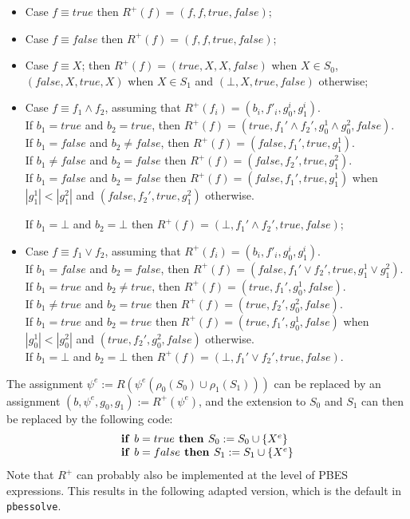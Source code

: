 \documentclass{article}
\newcommand{\If}{\text{\textbf{if }}}
\newcommand{\Then}{\text{\textbf{ then }}}
\begin{document}
\begin{itemize}
\item Case $f \equiv true$  then $R^+(f) = (f,f, true,false)$;

\item Case $f \equiv false$ then $R^+(f) = (f,f,true,false)$;

\item Case $f \equiv X$; then $R^+(f) =(true,X,X,false)$ when $X \in S_0$, $(false, X,true,X)$ when $X \in S_1$ and $(\bot, X,true,false)$ otherwise;

\item Case $f \equiv f_1 \wedge f_2$, assuming that $R^+(f_i) = (b_i,f'_i,g_0^i,g_1^i)$. \\
If $b_1 = true$ and $b_2 = true$, then $R^+(f) = (true, f_1' \wedge f_2',g_0^1 \wedge g_0^2,false)$. \\
If $b_1 = false$ and $b_2 \neq false$, then $R^+(f) = (false, f_1',true,g_1^1)$. \\
If $b_1 \neq false$ and $b_2 = false$ then $R^+(f) = (false,f_2',true,g_1^2)$. \\
If $b_1 = false$ and $b_2 = false$ then
$R^+(f) = (false, f_1',true,g_1^1)$ when $|g_1^1| < |g_1^2|$ and $(false,f_2',true,g_1^2)$ otherwise.

If $b_1 = \bot$ and $b_2 = \bot$ then $R^+(f) = (\bot, f_1' \wedge f_2',true,false)$;

\item Case $f \equiv f_1 \vee f_2$,  assuming that $R^+(f_i) = (b_i,f'_i,g_0^i,g_1^i)$.\\ 
If $b_1 = false$ and $b_2 = false$, then $R^+(f) = (false, f_1' \vee f_2',true,g_1^1\vee g_1^2)$.\\
If $b_1 = true$ and $b_2 \neq true$, then $R^+(f) = (true, f_1', g_0^1,false)$. \\
If $b_1 \neq true$ and $b_2 = true$ then $R^+(f) = (true,f_2',g_0^2,false)$. \\
If $b_1 = true$ and $b_2 = true$ then $R^+(f) = (true, f_1',g_0^1,false)$ when $|g_0^1| < |g_0^2|$ and $(true,f_2',g_0^2,false)$ otherwise. \\
If $b_1 = \bot$ and $b_2 = \bot$ then $R^+(f) = (\bot, f_1' \vee f_2',true,false)$.
\end{itemize}

The assignment $\psi^e := R(\psi^e(\rho_0(S_0) \cup \rho_1(S_1)))$ can be replaced by an assignment
$(b,\psi^e,g_0,g_1) := R^+(\psi^e)$, and the extension to $S_0$ and $S_1$ can then be replaced by the
following code:
\[
\begin{array}{l}
\If b = true \Then S_0 := S_0 \cup \{ X^e \} \\
\If b = false \Then S_1 := S_1 \cup \{ X^e \} \\
\end{array}
\]
Note that $R^+$ can probably also be implemented at the level of PBES expressions. This results in the following adapted version, which is the default in \texttt{pbessolve}.
\end{document}
